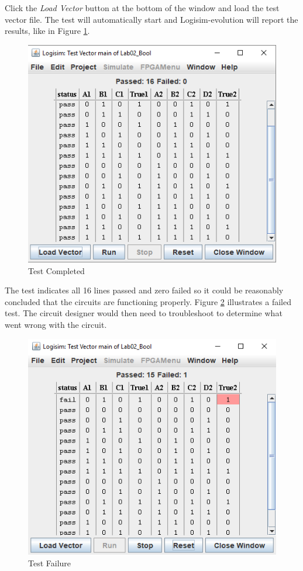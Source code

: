 Click the \textit{Load Vector} button at the bottom of the window and load the test vector file. The test will automatically start and Logisim-evolution will report the results, like in Figure \ref{fig:add-07}.

\begin{figure}[H]
	\centering
	\includegraphics[width=\maxwidth{.95\linewidth}]{gfx/add-07}
	\caption{Test Completed}
	\label{fig:add-07}
\end{figure}

The test indicates all 16 lines passed and zero failed so it could be reasonably concluded that the circuits are functioning properly. Figure \ref{fig:add-08} illustrates a failed test. The circuit designer would then need to troubleshoot to determine what went wrong with the circuit.

\begin{figure}[H]
	\centering
	\includegraphics[width=\maxwidth{.95\linewidth}]{gfx/add-08}
	\caption{Test Failure}
	\label{fig:add-08}
\end{figure}


